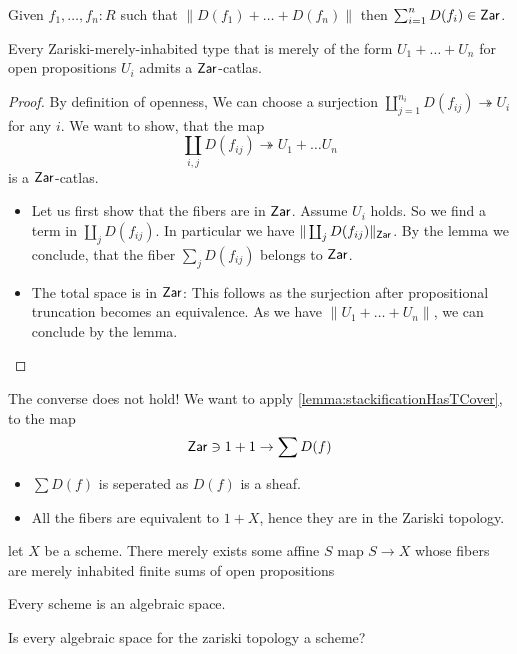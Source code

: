 \begin{lemma}
	Given $f_1, \hdots,f_n : R$ such that $\| D(f_1) + \hdots + D(f_n) \|$ then $\sum_{i=1}^n D(f_i) \in \mathsf{Zar}$.
\end{lemma}
\begin{prop}
	Every Zariski-merely-inhabited type that is merely of the form $U_1 + \hdots + U_n$ for open propositions $U_i$ admits a $\mathsf{Zar}$-catlas.
\end{prop}
\begin{proof}
	By definition of openness, We can choose a surjection $\coprod_{j=1}^{n_i} D(f_{ij}) \twoheadrightarrow U_i$ for any $i$. We want to show, that the map
	\[
	\coprod_{i , j} D(f_{ij}) \twoheadrightarrow U_1 + \hdots U_n
	\]
	is a $\mathsf{Zar}$-catlas. 
	\begin{itemize}
		\item Let us first show that the fibers are in $\mathsf{Zar}$. Assume $U_i$ holds. So we find a term in $\coprod_j D(f_{ij})$. In particular we have $\| \coprod_j D(f_{ij})\|_{\mathsf{Zar}}$. By the lemma we conclude, that the fiber $\sum_j D(f_{ij})$ belongs to $\mathsf{Zar}$.\\
		\item The total space is in $\mathsf{Zar}$: This follows as the surjection after propositional truncation becomes an equivalence. As we have $\| U_1 + \hdots + U_n\|$, we can conclude by the lemma.
	\end{itemize}
	
\end{proof}
\begin{warning}
	The converse does not hold! We want to apply \ref{lemma:stackificationHasTCover}, to the map
	\[\mathsf{Zar} \ni 1 + 1 \to \sum D(f) \]
	\begin{itemize}
		\item 	$\sum D(f)$ is seperated as $D(f)$ is a sheaf.
		\item 	All the fibers are equivalent to $1 + X$, hence they are in the Zariski topology.
	\end{itemize}	
\end{warning}
\begin{lemma}
	let $X$ be a scheme. There merely exists some affine $S$  map $S \to X$ whose fibers are merely inhabited finite sums of open propositions 
\end{lemma}

\begin{corollary}		
		Every scheme is an algebraic space.
\end{corollary}
\begin{question}
	Is every algebraic space for the zariski topology a scheme?
\end{question}


